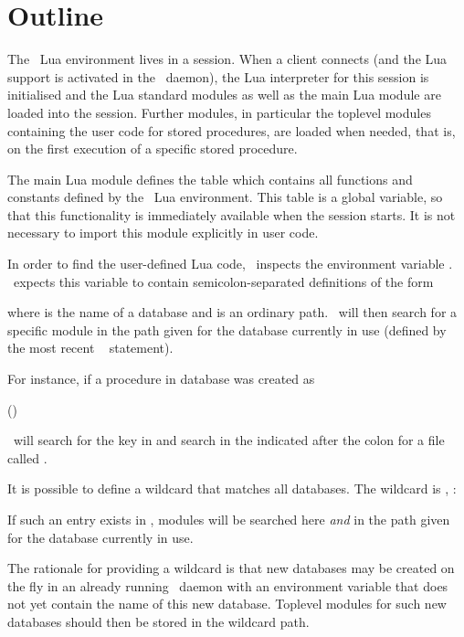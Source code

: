 \section{Outline}
The \nowdb\ Lua environment lives in a session.
When a client connects
(and the Lua support
is activated in the \nowdb\ daemon),
the Lua interpreter for this session is initialised
and the Lua standard modules 
as well as the main Lua module are loaded
into the session.
Further modules, in particular the toplevel modules
containing the user code for stored procedures,
are loaded when needed, that is, on the first
execution of a specific stored procedure.

The main Lua module defines the table 
 which contains all
functions and constants defined by
the \nowdb\ Lua environment.
This table is a global variable,
so that this functionality is immediately available
when the session starts.
It is not necessary to import this module explicitly
in user code.

In order to find the user-defined Lua code,
\nowdb\ inspects the environment variable
. \nowdb\ expects
this variable to contain
semicolon-separated definitions of the form


where  is the name of a database and
 is an ordinary  path.
\nowdb\ will then search for a specific module
in the path given for the database currently
in use (defined by the most recent
\sql\  statement).

For instance, if a procedure in database 
was created as

 ()
 

\nowdb\ will search for the key  in
 and search in the 
indicated after the colon for a file called
.

It is possible to define a wildcard that matches all databases.
The wildcard is \tech{*}, \eg:


If such an entry exists in ,
modules will be searched here \emph{and} in the path given
for the database currently in use.

The rationale for providing a wildcard is that
new databases may be created on the fly in an already
running \nowdb\ daemon with an environment variable
that does not yet contain the name of this new database.
Toplevel modules for such new databases
should then be stored in the wildcard path.

